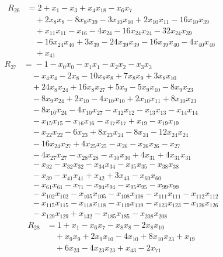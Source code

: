 \begin{align*}
R_{26}&={}2 +x_{1} -x_{3} +x_{4}x_{18} -x_{6}x_{7}\\
&\quad{}+2x_{8}x_{8} -8x_{8}x_{39} -3x_{10}x_{10} +2x_{10}x_{11} -16x_{10}x_{39}\\
&\quad{}+x_{11}x_{11} -x_{16} -4x_{24} -16x_{24}x_{24} -32x_{24}x_{39}\\
&\quad{}-16x_{24}x_{40} +3x_{39} -24x_{39}x_{39} -16x_{39}x_{40} -4x_{40}x_{40}\\
&\quad{}+x_{41}
\end{align*}
\begin{align*}
R_{27}&={}-1 -x_{0}x_{0} -x_{1}x_{1} -x_{2}x_{2} -x_{3}x_{3}\\
&\quad{}-x_{4}x_{4} -2x_{8} -10x_{8}x_{8} +7x_{8}x_{9} +3x_{8}x_{10}\\
&\quad{}+24x_{8}x_{24} +16x_{8}x_{27} +5x_{9} -5x_{9}x_{10} -8x_{9}x_{23}\\
&\quad{}-8x_{9}x_{24} +2x_{10} -4x_{10}x_{10} +2x_{10}x_{11} +8x_{10}x_{23}\\
&\quad{}-8x_{10}x_{24} -4x_{10}x_{27} -x_{12}x_{12} -x_{13}x_{13} -x_{14}x_{14}\\
&\quad{}-x_{15}x_{15} -x_{16}x_{16} -x_{17}x_{17} +x_{19} -x_{19}x_{19}\\
&\quad{}-x_{22}x_{22} -6x_{23} +8x_{23}x_{24} -8x_{24} -12x_{24}x_{24}\\
&\quad{}-16x_{24}x_{27} +4x_{25}x_{25} -x_{26} -x_{26}x_{26} -x_{27}\\
&\quad{}-4x_{27}x_{27} -x_{28}x_{28} -x_{30}x_{30} +4x_{31} +4x_{31}x_{31}\\
&\quad{}-x_{32} -x_{32}x_{32} -x_{34}x_{34} -x_{35}x_{35} -x_{38}x_{38}\\
&\quad{}-x_{39} -x_{41}x_{41} +x_{42} +3x_{43} -x_{60}x_{60}\\
&\quad{}-x_{61}x_{61} -x_{71} -x_{94}x_{94} -x_{95}x_{95} -x_{99}x_{99}\\
&\quad{}-x_{102}x_{102} -x_{105}x_{105} -x_{108}x_{108} -x_{111}x_{111} -x_{112}x_{112}\\
&\quad{}-x_{115}x_{115} -x_{118}x_{118} -x_{119}x_{119} -x_{123}x_{123} -x_{126}x_{126}\\
&\quad{}-x_{129}x_{129} +x_{132} -x_{185}x_{185} -x_{208}x_{208}
\end{align*}
\begin{align*}
R_{28}&={}1 +x_{1} -x_{6}x_{7} -x_{8}x_{8} -2x_{8}x_{10}\\
&\quad{}+x_{9}x_{9} +2x_{9}x_{10} -4x_{10} +8x_{10}x_{23} +x_{19}\\
&\quad{}+6x_{23} -4x_{23}x_{23} +x_{43} -2x_{71}
\end{align*}
